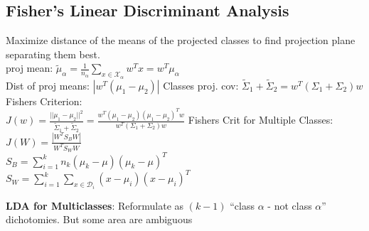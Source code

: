 \subsection*{Fisher's Linear Discriminant Analysis}
Maximize distance of the means of the projected classes to find projection plane separating them best.\\
proj mean: $\tilde{\mu}_{\alpha}{=}\frac{1}{n_{\alpha}}\sum_{x\in\mathcal{X}_{\alpha}}w^Tx{=}w^T\mu_{\alpha}$\\
Dist of proj means: $|w^T(\mu_1-\mu_2)|$
Classes proj. cov: $\tilde{\Sigma}_1{+}\tilde{\Sigma}_2{=}w^T(\Sigma_1{+}\Sigma_2)w$\\
Fishers Criterion:\\
$J(w)=\frac{||\mu_1-\mu_2||^2}{\tilde{\Sigma}_1{+}\tilde{\Sigma}_2}=\frac{w^T(\mu_1-\mu_2)(\mu_1-\mu_2)^Tw}{w^T(\Sigma_1{+}\Sigma_2)w}$
Fishers Crit for Multiple Classes:\\
$J(W)=\frac{|W^TS_BW|}{W^TS_WW}$\\
$S_B=\sum_{i=1}^kn_k(\mu_k-\mu)(\mu_k-\mu)^T$\\
$S_W=\sum_{i=1}^k\sum_{x\in \mathcal{D}_i}(x-\mu_i)(x-\mu_i)^T$

\textbf{LDA for Multiclasses}: 
Reformulate as $(k-1)$ ``class $\alpha$ - not class $\alpha$'' dichotomies. But some area are ambiguous

